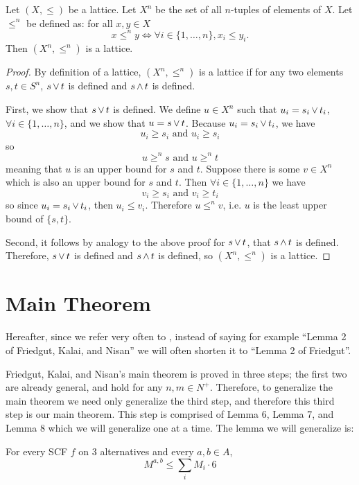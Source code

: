 	\begin{proposition}
		\label{proposition-grid-is-lattice}
		Let $(X, \le)$ be a lattice. Let $X^n$ be the set of all $n$-tuples of elements of $X$. Let $\le^n$ be defined as: for all $x, y \in X$
		\[
			x \le^n y \iff \forall i \in \{1, \ldots, n\}, x_i \le y_i.
		\]
		Then $(X^n, \le^n)$ is a lattice.
	\end{proposition}

	\begin{proof}
		By definition of a lattice, $(X^n, \le^n)$ is a lattice if for any two elements $s, t \in S^n$, $s \operatorname{\vee} t$ is defined and $s \operatorname{\wedge} t$ is defined.

		First, we show that $s \operatorname{\vee} t$ is defined. We define $u \in X^n$ such that $u_i = s_i \operatorname{\vee} t_i$, $\forall i \in \{1, \ldots, n\}$, and we show that $u = s \operatorname{\vee} t$. Because $u_i = s_i \operatorname{\vee} t_i$, we have
		\[
			u_i \ge s_i \textrm{ and } u_i \ge s_i
		\]
		so
		\[
			u \ge^n s \textrm{ and } u \ge^n t
		\]
		meaning that $u$ is an upper bound for $s$ and $t$. Suppose there is some $v \in X^n$ which is also an upper bound for $s$ and $t$. Then $\forall i \in \{1, \ldots, n\}$ we have
		\[
			v_i \ge s_i \textrm{ and } v_i \ge t_i
		\]
		so since $u_i = s_i \operatorname{\vee} t_i$, then $u_i \le v_i$. Therefore $u \le^n v$, i.e. $u$ is the least upper bound of $\{s, t\}$.

		Second, it follows by analogy to the above proof for $s \operatorname{\vee} t$, that $s \operatorname{\wedge} t$ is defined. Therefore, $s \operatorname{\vee} t$ is defined and $s \operatorname{\wedge} t$ is defined, so $(X^n, \le^n)$ is a lattice.
	\end{proof}


\section{Main Theorem}

	Hereafter, since we refer very often to \cite{friedgut2008elections}, instead of saying for example ``Lemma 2 of Friedgut, Kalai, and Nisan'' we will often shorten it to ``Lemma 2 of Friedgut''.

	Friedgut, Kalai, and Nisan's main theorem is proved in three steps; the first two are already general, and hold for any $n, m \in N^+$. Therefore, to generalize the main theorem we need only generalize the third step, and therefore this third step is our main theorem. This step is comprised of Lemma 6, Lemma 7, and Lemma 8 which we will generalize one at a time. The lemma we will generalize is:

	\begin{lemma}
		For every SCF $f$ on $3$ alternatives and every $a,b \in A$,
		\[
			M^{a,b} \le \sum_i M_i \cdot 6
		\]
	\end{lemma}

